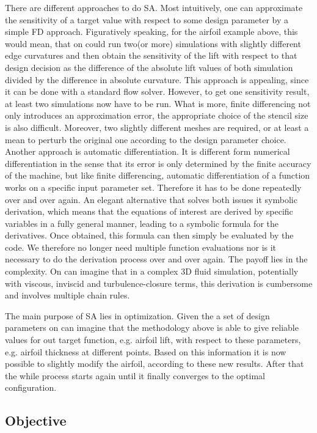There are different approaches to do \ac{SA}. Most intuitively, one can approximate the sensitivity of a target value with respect to some design parameter by a simple \ac{FD} approach. Figuratively speaking, for the airfoil example above, this would mean, that on could run two(or more) simulations with slightly different edge curvatures and then obtain the sensitivity of the lift with respect to that design decision as the difference of the absolute lift values of both simulation divided by the difference in absolute curvature. This approach is appealing, since it can be done with a standard flow solver. However, to get one sensitivity result, at least two simulations now have to be run. What is more, finite differencing not only introduces an approximation error, the appropriate choice of the stencil size is also difficult. Moreover, two slightly different meshes are required, or at least a mean to perturb the original one according to the design parameter choice.\\
Another approach is automatic differentiation. It is different form numerical differentiation in the sense that its error is only determined by the finite accuracy of the machine, but like finite differencing, automatic differentiation of a function works on a specific input parameter set. Therefore it has to be done repeatedly over and over again.
An elegant alternative that solves both issues it symbolic derivation, which means that the equations of interest are derived by specific variables in a fully general manner, leading to a symbolic formula for the derivatives. Once obtained, this formula can then simply be evaluated by the code. We therefore no longer need multiple function evaluations nor is it necessary to do the derivation process over and over again. The payoff lies in the complexity. On can imagine that in a complex 3D fluid simulation, potentially with viscous, inviscid and turbulence-closure terms, this derivation is cumbersome and involves multiple chain rules.

The main purpose of \ac{SA} lies in optimization. Given the a set of design parameters on can imagine that the methodology above is able to give reliable values for out target function, e.g. airfoil lift, with respect to these parameters, e.g. airfoil thickness at different points. Based on this information it is now possible to slightly modify the airfoil, according to these new results. After that the while process starts again until it finally converges to the optimal configuration.
\subsection{Objective}\label{sec:objective}

